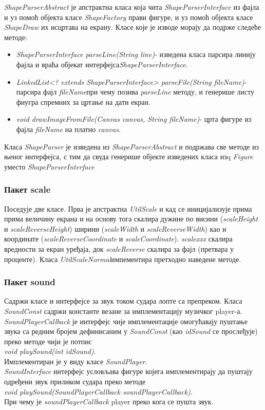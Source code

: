 \emph{ShapeParserAbstract} је апстрактна класа која чита \emph{ShapeParserInterface} из фајла и уз помоћ објекта класе \emph{ShapeFactory} прави фигуре, и уз помоћ објекта класе \emph{ShapeDraw} их исцртава на екрану. Класе које је изводе морају да подрже следеће методе:
\begin{itemize}
\item \emph{ShapeParserInterface parseLine(String line)}- изведена класа парсира линију фајла и враћа објекат интерфејса\emph{ShapeParserInterface}.
\item \emph{LinkedList<? extends ShapeParserInterface> parseFile(String fileName)}-парсира фајл \emph{fileName}при чему позива \emph{parseLine} методу, и генерише листу фиугра спремних за цртање на дати екран.
\item \emph{void drawImageFromFile(Canvas canvas, String fileName)}- црта фигуре из фајла \emph{fileName} на платно \emph{canvas}.
\end{itemize}

Класа \emph{ShapeParser} је изведена из \emph{ShapeParserAbstract} и подржава све методе из њеног интерфејса, с тим да свуда генерише објекте изведених класа изq \emph{Figure} уместо \emph{ShapeParserInterface}

\subsubsection{Пакет scale}
Поседује две класе. Прва је апстрактна \emph{UtilScale} и кад се иницијализује прима прима величину екрана и на основу тога скалира дужине по висини (\emph{scaleHeight} и \emph{scaleReverseHeight}) ширини (\emph{scaleWidth} и \emph{scaleReverseWidth}) као и координате (\emph{scaleReverseCoordinate} и \emph{scaleCoordinate}). \emph{scalexxx} скалира вредности за екран уређаја, док \emph{scaleReverse} скалира за фајл (претвара у проценте). Класа \emph{UtilScaleNormal}импементира претходно наведене методе.
\subsubsection{Пакет sound}
Садржи класе и интерфејсе за звук током судара лопте са препреком. Класа \emph{SoundConst} садржи  константе везане за имплементацију музичког player-а. \emph{SoundPlayerCallback} је интерфејс чије имплементације омогућавају пуштање звука са редним бројем дефинисаним у \emph{SoundConst} (као \emph{idSound} се прослеђује) преко методе чији је потпис 
\\  \indent \emph{void playSound(int idSound)}.\\  Имплементиран је у виду класе \emph{SoundPlayer}.
\\ \indent
\emph{SoundInterface} интерфејс условљава фигуре којега имплементирају да пуштају одређени звук приликом судара преко методе\\ \indent  \emph{void playSound(SoundPlayerCallback soundPlayerCallback)}.\\
При чему је \emph{soundPlayerCallback} player преко кога се пушта звук.

 
 


